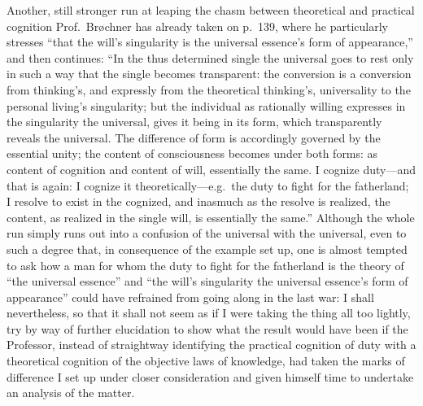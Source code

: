 \documentclass[12pt]{book}
\newcommand{\opage}[1]{\marginnote{\footnotesize\textit{[#1]}}}
\begin{document}
Another, still stronger run at leaping the chasm between theoretical and
practical cognition Prof.\ Brøchner has already taken on p.\ 139, where
he particularly stresses ``that the will's singularity is the universal
essence's form of appearance,'' and then continues: ``In the thus
determined single the universal goes to rest only in such a way that the
single becomes transparent: the conversion is a conversion from
thinking's, and expressly from the theoretical thinking's, universality
to the personal living's singularity; but the individual as rationally
willing expresses in the singularity the universal, gives it being in its
form, which transparently reveals the universal. The difference of form
is accordingly governed by the essential unity; the content of
consciousness becomes under both forms: as content of cognition and
content of will, essentially the same. I cognize duty---and that is
again: I cognize it theoretically---e.g.\ the duty to fight for the
fatherland; I resolve to exist in the cognized, and inasmuch as the
resolve is realized, the content, as realized in the single will, is
essentially the same.'' Although the whole run simply runs out into a
confusion of the universal with the universal, even to such a degree
that, in consequence of the example set up, one is almost tempted to ask
how a man for whom the duty to fight
for the fatherland is the theory of ``the universal essence'' and ``the
will's singularity the universal essence's form of appearance'' could
have refrained from going along in the last war: I shall nevertheless, so
that it shall not seem as
\opage{27}\setcounter{footnote}{0}%
if I were taking the thing all too lightly, try by way of further
elucidation to show what the result would have been if the Professor,
instead of straightway identifying the practical cognition of duty with a
theoretical cognition of the objective laws of knowledge, had taken the
marks of difference I set up under closer consideration and given himself
time to undertake an analysis of the matter.
\end{document}
